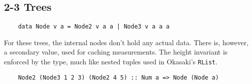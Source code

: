 \subsection{2-3 Trees}

\begin{verbatim}
    data Node v a = Node2 v a a | Node3 v a a a
\end{verbatim}

For these trees, the internal nodes don't hold any actual data. There is, however, a secondary value, used for caching measurements. The height invariant is enforced by the type, much like nested tuples used in Okasaki's \texttt{RList}.

\begin{verbatim}
    Node2 (Node3 1 2 3) (Node2 4 5) :: Num a => Node (Node a)
\end{verbatim}